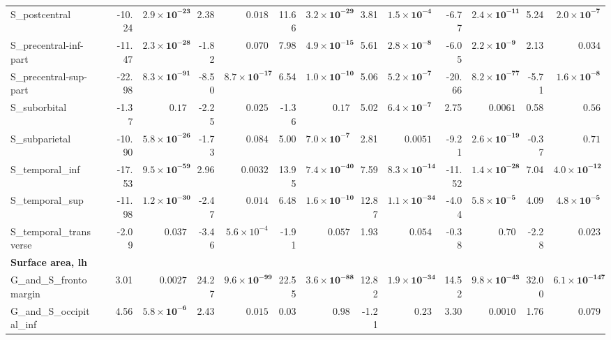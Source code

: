 {\begin{longtable}{llrrrrrrrrrrrr}
S\_postcentral &  & -10.24 & $\mathbf{2.9{\times}10^{-23}}$ & 2.38 & $0.018$ & 11.66 & $\mathbf{3.2{\times}10^{-29}}$ & 3.81 & $\mathbf{1.5{\times}10^{-4}}$ & -6.77 & $\mathbf{2.4{\times}10^{-11}}$ & 5.24 & $\mathbf{2.0{\times}10^{-7}}$ \\
S\_precentral-inf-part &  & -11.47 & $\mathbf{2.3{\times}10^{-28}}$ & -1.82 & $0.070$ & 7.98 & $\mathbf{4.9{\times}10^{-15}}$ & 5.61 & $\mathbf{2.8{\times}10^{-8}}$ & -6.05 & $\mathbf{2.2{\times}10^{-9}}$ & 2.13 & $0.034$ \\
S\_precentral-sup-part &  & -22.98 & $\mathbf{8.3{\times}10^{-91}}$ & -8.50 & $\mathbf{8.7{\times}10^{-17}}$ & 6.54 & $\mathbf{1.0{\times}10^{-10}}$ & 5.06 & $\mathbf{5.2{\times}10^{-7}}$ & -20.66 & $\mathbf{8.2{\times}10^{-77}}$ & -5.71 & $\mathbf{1.6{\times}10^{-8}}$ \\
S\_suborbital &  & -1.37 & $0.17$ & -2.25 & $0.025$ & -1.36 & $0.17$ & 5.02 & $\mathbf{6.4{\times}10^{-7}}$ & 2.75 & $0.0061$ & 0.58 & $0.56$ \\
S\_subparietal &  & -10.90 & $\mathbf{5.8{\times}10^{-26}}$ & -1.73 & $0.084$ & 5.00 & $\mathbf{7.0{\times}10^{-7}}$ & 2.81 & $0.0051$ & -9.21 & $\mathbf{2.6{\times}10^{-19}}$ & -0.37 & $0.71$ \\
S\_temporal\_inf &  & -17.53 & $\mathbf{9.5{\times}10^{-59}}$ & 2.96 & $0.0032$ & 13.95 & $\mathbf{7.4{\times}10^{-40}}$ & 7.59 & $\mathbf{8.3{\times}10^{-14}}$ & -11.52 & $\mathbf{1.4{\times}10^{-28}}$ & 7.04 & $\mathbf{4.0{\times}10^{-12}}$ \\
S\_temporal\_sup &  & -11.98 & $\mathbf{1.2{\times}10^{-30}}$ & -2.47 & $0.014$ & 6.48 & $\mathbf{1.6{\times}10^{-10}}$ & 12.87 & $\mathbf{1.1{\times}10^{-34}}$ & -4.04 & $\mathbf{5.8{\times}10^{-5}}$ & 4.09 & $\mathbf{4.8{\times}10^{-5}}$ \\
S\_temporal\_transverse &  & -2.09 & $0.037$ & -3.46 & $5.6{\times}10^{-4}$ & -1.91 & $0.057$ & 1.93 & $0.054$ & -0.38 & $0.70$ & -2.28 & $0.023$ \\
\midrule\multicolumn{14}{l}{\textbf{Surface area, lh}} \\
G\_and\_S\_frontomargin &  & 3.01 & $0.0027$ & 24.27 & $\mathbf{9.6{\times}10^{-99}}$ & 22.55 & $\mathbf{3.6{\times}10^{-88}}$ & 12.82 & $\mathbf{1.9{\times}10^{-34}}$ & 14.52 & $\mathbf{9.8{\times}10^{-43}}$ & 32.00 & $\mathbf{6.1{\times}10^{-147}}$ \\
G\_and\_S\_occipital\_inf &  & 4.56 & $\mathbf{5.8{\times}10^{-6}}$ & 2.43 & $0.015$ & 0.03 & $0.98$ & -1.21 & $0.23$ & 3.30 & $0.0010$ & 1.76 & $0.079$ \\

\end{longtable}}
